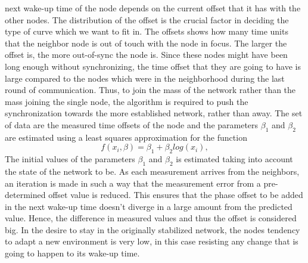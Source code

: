 \documentclass[journal]{IEEEtran}
\begin{document}
next wake-up time of the node depends on the current offset that it
has with the other nodes. The distribution of the offset is the
crucial factor in deciding the type of curve which we want to fit
in. The offsets shows how many time units that the neighbor node is
out of touch with the node in focus. The larger the offset is, the
more out-of-sync the node is.\newline 
Since these nodes might have been long enough without synchronizing,
the time offset that they are going to have is large compared to the
nodes which were in the neighborhood during the last round of
communication. Thus, to join the mass of the network rather than the
mass joining the single node, the algorithm is required to push the
synchronization towards the more established network, rather than
away.\newline 
The set of data are the measured time offsets of the node and the
parameters $\beta_1$ and $\beta_2$ are estimated using a least
squares approximation for the function 
\begin{equation}
 f(x_i,\beta)= \beta _1 + \beta_2log(x_i),
\end{equation}
The initial values of the parameters $\beta_1$ and $\beta_2$ is estimated taking into account
the state of the network to be. \newline
As each measurement arrives from the neighbors, an iteration is made in such a way that
the measurement error from a pre-determined offset value is reduced.
This ensures that the phase offset to be added in the next wake-up
time doesn't diverge in a large amount from the predicted value.
Hence, the difference in measured values and thus the offset is
considered big. In the desire to stay in the originally stabilized
network, the nodes tendency to adapt a new environment is very low,
in this case resisting any change that is going to happen to its
wake-up time.
\end{document}
